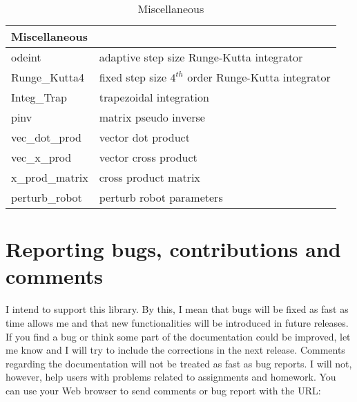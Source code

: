 \documentclass[11pt,fleqn,letterpaper]{report}
\newcommand{\mbold}[1]{\mbox{\boldmath $ #1 $}}
\newcommand{\dfdx}[2]{\frac{\partial #1}{\partial #2}}
\begin{document}
\begin{table}[htbp]
\begin{center}
\end{center}
\end{table}

\begin{table}[htbp]
\caption{Miscellaneous}
\label{tab:commandsum3}
\begin{center}
\begin{tabular}{||l|l||}
\hline
\hline
\multicolumn{2}{||l||}{{\bf Miscellaneous}} \\
\hline
\hline
odeint & adaptive step size Runge-Kutta integrator \\
\hline
Runge\_Kutta4 & fixed step size $4^{th}$ order Runge-Kutta integrator \\
\hline
Integ\_Trap & trapezoidal integration \\
\hline
pinv & matrix pseudo inverse \\
\hline
vec\_dot\_prod & vector dot product \\
\hline
vec\_x\_prod & vector cross product \\
\hline
x\_prod\_matrix & cross product matrix\\
\hline
perturb\_robot & perturb robot parameters \\
\hline
\hline
\end{tabular}
\end{center}
\end{table}


\chapter{Reporting bugs, contributions and comments}

I intend to support this library. By this, I mean that bugs will be fixed as fast as
time allows me and that new functionalities will be introduced in future releases.
If you find a bug or think some part of the documentation could be improved, 
let me know and I will try to include the corrections in the next release.
Comments regarding the documentation will not be treated as fast as bug reports. 
I will not, however, help users with problems related to assignments and homework.
You can use your Web browser to send comments or bug report with the URL: 
\end{document}
